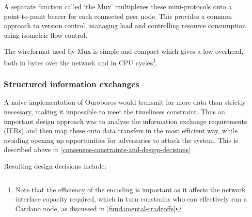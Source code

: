 \documentclass[11pt,a4paper]{article}
\begin{document}
A separate function called `the Mux' multiplexes these mini-protocols
onto a point-to-point bearer for each connected peer node. This provides
a common approach to version control, managing load and controlling
resource consumption using isometric flow control.

The wireformat used by Mux is simple and compact which gives a low
overhead, both in bytes over the network and in CPU cycles\footnote{Note
  that the efficiency of the encoding is important as it affects the
  network interface capacity required, which in turn constrains who can
  effectively run a Cardano node, as discussed in
  \cref{fundamental-tradeoffs}}.

\subsubsection{Structured information exchanges}
\label{structured-information-exchanges}

A naive implementation of Ouroboros would transmit far more data than
strictly necessary, making it impossible to meet the timeliness
constraint. Thus an important design approach was to analyse the
information exchange requirements (IERs) and then map these onto data
transfers in the most efficient way, while avoiding opening up
opportunities for adversaries to attack the system. This is described
above in
\cref{consensus-constraints-and-design-decisions}

Resulting design decisions include:
\end{document}
